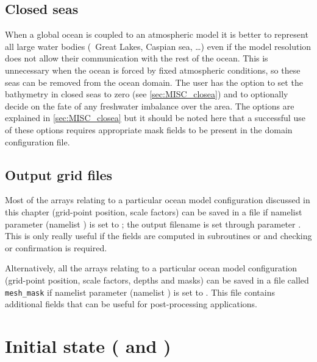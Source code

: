\documentclass[../main/NEMO_manual]{subfiles}
\begin{document}
\subsection{Closed seas}
\label{subsec:DOM_closea}

When a global ocean is coupled to an atmospheric model it is better to
represent all large water bodies (\eg\ Great Lakes, Caspian sea, \dots) even if
the model resolution does not allow their communication with the rest of the ocean.
This is unnecessary when the ocean is forced by fixed atmospheric conditions,
so these seas can be removed from the ocean domain.
The user has the option to
set the bathymetry in closed seas to zero (see \autoref{sec:MISC_closea}) and to
optionally decide on the fate of any freshwater imbalance over the area.
The options are explained in \autoref{sec:MISC_closea} but
it should be noted here that a successful use of these options requires
appropriate mask fields to be present in the domain configuration file.

\subsection{Output grid files}
\label{subsec:DOM_meshmask}

Most of the arrays relating to a particular ocean model configuration discussed in this chapter
(grid-point position, scale factors) can be saved in a file if
namelist parameter  (namelist ) is set to
;
the output filename is set through parameter .
This is only really useful if
the fields are computed in subroutines  or  and
checking or confirmation is required.

Alternatively, all the arrays relating to a particular ocean model configuration
(grid-point position, scale factors, depths and masks) can be saved in
a file called \texttt{mesh\_mask} if
namelist parameter  (namelist ) is set to
.
This file contains additional fields that can be useful for post-processing applications.

\section[Initial state (\textit{istate.F90} and \textit{dtatsd.F90})]{Initial state (\protect{} and \protect{})}
\label{sec:DOM_DTA_tsd}
\end{document}
